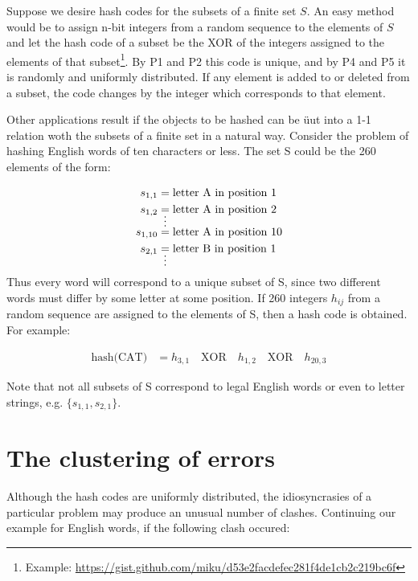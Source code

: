 \documentclass{article}
\begin{document}
Suppose we desire hash codes for the subsets of a finite set $S$. An easy
method would be to assign n-bit integers from a random sequence to the elements
of $S$ and let the hash code of a subset be the XOR of the integers assigned to
the elements of that subset\footnote{Example:
\url{https://gist.github.com/miku/d53e2facdefec281f4de1cb2c219bc6f}}. By P1
and P2 this code is unique, and by P4 and P5 it is randomly and uniformly
distributed. If any element is added to or deleted from a subset, the code
changes by the integer which corresponds to that element.

Other applications result if the objects to be hashed can be üut into a 1-1
relation woth the subsets of a finite set in a natural way. Consider the
problem of hashing English words of ten characters or less. The set S could be
the 260 elements of the form:

\begin{align*}
s_{1,1} &= \text{letter A in position 1} \\
s_{1,2} &= \text{letter A in position 2} \\
&\shortvdotswithin{=}
s_{1,10} &= \text{letter A in position 10} \\
s_{2,1} &= \text{letter B in position 1} \\
&\shortvdotswithin{=}
\end{align*}

Thus every word will correspond to a unique subset of S, since two different
words must differ by some letter at some position. If 260 integers $h_{ij}$
from a random sequence are assigned to the elements of S, then a hash code is
obtained. For example:

\begin{align*}
\text{hash(CAT)} &= h_{3,1} \quad \text{XOR} \quad h_{1,2} \quad \text{XOR} \quad h_{20,3}
\end{align*}

Note that not all subsets of S correspond to legal English words or even to
letter strings, e.g. $\{s_{1,1}, s_{2,1}\}$.

\section*{The clustering of errors}

Although the hash codes are uniformly distributed, the idiosyncrasies of a
particular problem may produce an unusual number of clashes. Continuing our
example for English words, if the following clash occured:
\end{document}
